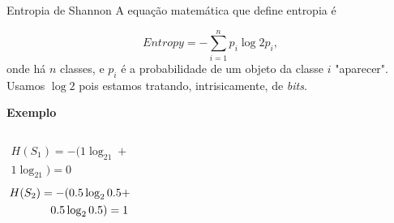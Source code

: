 \documentclass{beamer}
\begin{document}
\begin{frame}{Entropia de Shannon}
    A equação matemática que define entropia é
    
    \begin{equation}
        Entropy = - \sum_{i=1}^n p_i \log{2p_i},
    \end{equation}
    onde há $n$ classes, e $p_i$ é a probabilidade de um objeto da classe $i$ "aparecer". Usamos $\log{2}$ pois estamos tratando, intrisicamente, de \textit{bits}.
    
    \begin{center}
        \textcolor{feadevcolor}{\textbf{Exemplo}}
    \end{center}
    
    \begin{columns}
    
    \begin{multline*}
        H(S_1) = -(1 \log_21 +\\
        1 \log_21) = 0
    \end{multline*}
    \begin{multline*}
        H(S_2) = -(0.5 \log_2 0.5 +\\
        \hspace{0.1\textwidth} 0.5 \log_2 0.5) = 1
    \end{multline*}
    \end{columns}

\end{frame}
\end{document}
